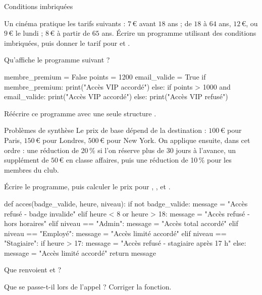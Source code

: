 \begin{exercice}[2]{Conditions imbriquées}
\begin{questions}
  \item Un cinéma pratique les tarifs suivants : $7$\,€ avant $18$ ans ; de $18$ à $64$ ans, $12$\,€, ou $9$\,€ le lundi ; $8$\,€ à
    partir de $65$ ans. Écrire un programme utilisant des conditions imbriquées, puis donner le tarif pour  et
    .
  \item Qu'affiche le programme suivant ?
\begin{python}
membre_premium = False
points = 1200
email_valide = True
if membre_premium:
    print("Accès VIP accordé")
else:
    if points > 1000 and email_valide:
        print("Accès VIP accordé")
    else:
        print("Accès VIP refusé")
\end{python}
  \item Réécrire ce programme avec une seule structure .
\end{questions}
\end{exercice}


\begin{exercice}[3]{Problèmes de synthèse}
Le prix de base dépend de la destination : $100$\,€ pour Paris, $150$\,€ pour Londres, $500$\,€ pour New York. On applique ensuite,
dans cet ordre : une réduction de 20\,\% si l'on réserve plus de $30$ jours à l'avance, un supplément de $50$\,€ en classe affaires,
puis une réduction de 10\,\% pour les membres du club.
\begin{questions}
  \item Écrire le programme, puis calculer le prix pour , ,
     et .
\end{questions}
\begin{python}
def acces(badge_valide, heure, niveau):
    if not badge_valide:
        message = "Accès refusé - badge invalide"
    elif heure < 8 or heure > 18:
        message = "Accès refusé - hors horaires"
    elif niveau == "Admin":
        message = "Accès total accordé"
    elif niveau == "Employé":
        message = "Accès limité accordé"
    elif niveau == "Stagiaire":
        if heure > 17:
            message = "Accès refusé - stagiaire après 17 h"
        else:
            message = "Accès limité accordé"
    return message
\end{python}
\begin{questions}[resume]
  \item Que renvoient  et  ?
  \item Que se passe-t-il lors de l'appel  ? Corriger la fonction.
\end{questions}
\end{exercice}

